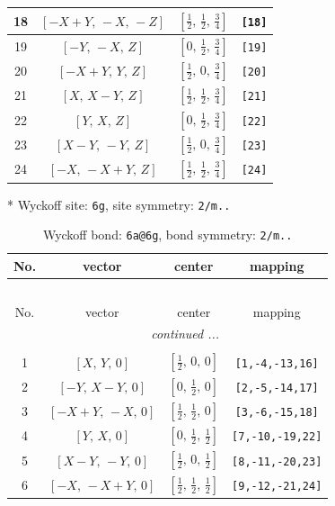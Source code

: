 \documentclass[fleqn,8pt]{jsarticle}
\begin{document}
\begin{longtable}{cccc}
18 & $\left[ - X + Y,\, - X,\, - Z \right]$ & $\left[ \frac{1}{2},\, \frac{1}{2},\, \frac{3}{4} \right]$ & {\tt [18]} \\ \hline
19 & $\left[ - Y,\, - X,\, Z \right]$ & $\left[ 0,\, \frac{1}{2},\, \frac{3}{4} \right]$ & {\tt [19]} \\ \hline
20 & $\left[ - X + Y,\, Y,\, Z \right]$ & $\left[ \frac{1}{2},\, 0,\, \frac{3}{4} \right]$ & {\tt [20]} \\ \hline
21 & $\left[ X,\, X - Y,\, Z \right]$ & $\left[ \frac{1}{2},\, \frac{1}{2},\, \frac{3}{4} \right]$ & {\tt [21]} \\ \hline
22 & $\left[ Y,\, X,\, Z \right]$ & $\left[ 0,\, \frac{1}{2},\, \frac{3}{4} \right]$ & {\tt [22]} \\ \hline
23 & $\left[ X - Y,\, - Y,\, Z \right]$ & $\left[ \frac{1}{2},\, 0,\, \frac{3}{4} \right]$ & {\tt [23]} \\ \hline
24 & $\left[ - X,\, - X + Y,\, Z \right]$ & $\left[ \frac{1}{2},\, \frac{1}{2},\, \frac{3}{4} \right]$ & {\tt [24]} \\
\end{longtable}
* Wyckoff site: {\tt 6g}, site symmetry: {\tt 2/m..}
\renewcommand{\arraystretch}{1.2}
\begin{longtable}{cccc}
\caption{Wyckoff bond: {\tt 6a@6g}, bond symmetry: {\tt 2/m..}}
 \\
 \hline \hline
No. & vector & center & mapping \\ \hline \endfirsthead

\multicolumn{3}{l}{\tablename\ \thetable{}} \\
 \hline \hline
No. & vector & center & mapping \\ \hline \endhead

 \hline \hline
\multicolumn{3}{r}{\footnotesize\it continued ...} \\ \endfoot

 \hline \hline
\multicolumn{3}{r}{} \\ \endlastfoot

1 & $\left[ X,\, Y,\, 0 \right]$ & $\left[ \frac{1}{2},\, 0,\, 0 \right]$ & {\tt [1,-4,-13,16]} \\ \hline
2 & $\left[ - Y,\, X - Y,\, 0 \right]$ & $\left[ 0,\, \frac{1}{2},\, 0 \right]$ & {\tt [2,-5,-14,17]} \\ \hline
3 & $\left[ - X + Y,\, - X,\, 0 \right]$ & $\left[ \frac{1}{2},\, \frac{1}{2},\, 0 \right]$ & {\tt [3,-6,-15,18]} \\ \hline
4 & $\left[ Y,\, X,\, 0 \right]$ & $\left[ 0,\, \frac{1}{2},\, \frac{1}{2} \right]$ & {\tt [7,-10,-19,22]} \\ \hline
5 & $\left[ X - Y,\, - Y,\, 0 \right]$ & $\left[ \frac{1}{2},\, 0,\, \frac{1}{2} \right]$ & {\tt [8,-11,-20,23]} \\ \hline
6 & $\left[ - X,\, - X + Y,\, 0 \right]$ & $\left[ \frac{1}{2},\, \frac{1}{2},\, \frac{1}{2} \right]$ & {\tt [9,-12,-21,24]} \\
\end{longtable}
\end{document}
